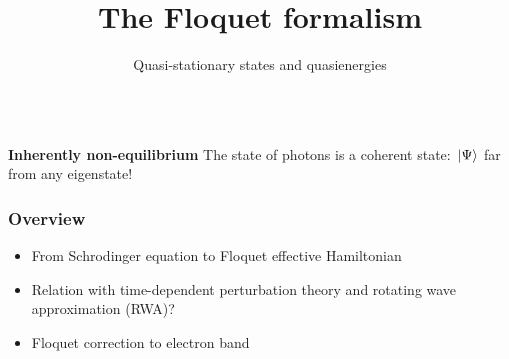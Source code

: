 \documentclass[t]{beamer}
\begin{document}
\begin{frame}
\begin{columns}
\begin{column}{0.3\textwidth}
\begin{center}
\begin{tikzpicture}[x=0.75pt,y=0.75pt,yscale=-0.5,xscale=0.5]
        
        \end{tikzpicture}        
\end{center} 
\end{column}

\end{columns}

\vspace{0.25cm}

\textbf{Inherently non-equilibrium} The state of photons is a coherent state: $\ket*{\Psi}$ far from any eigenstate!

\end{frame}

\begin{frame}
\frametitle{Overview}

\begin{itemize}
    \item From Schrodinger equation to Floquet effective Hamiltonian
    \item Relation with time-dependent perturbation theory and rotating wave approximation (RWA)?
    \item Floquet correction to electron band  
\end{itemize}

\end{frame}

\begingroup

\title{The Floquet formalism}
\subtitle{Quasi-stationary states and quasienergies}
\author{}
\date{}

\begin{frame}
    \titlepage
\end{frame}
\end{document}
